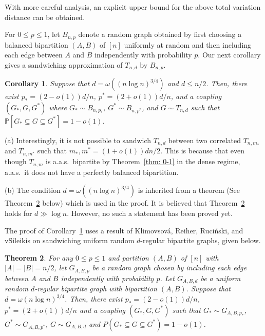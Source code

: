\documentclass[11pt]{article}
\renewcommand{\v}{\textup{\textsf{v}}}
\def\P{\mathbb P}
\theoremstyle{plain}
\newtheorem{thm}{Theorem}[section]
\newtheorem{cor}[thm]{Corollary}
\begin{document}
    With more careful analysis, an explicit upper bound for the above total variation distance can be obtained.




For $0 \leq p \leq 1$, let $B_{n,p}$ denote a random graph obtained by first choosing a balanced bipartition $(A,B)$ of $[n]$ uniformly at random and then including each edge between $A$ and $B$ independently with probability $p$. Our next corollary gives a sandwiching approximation of $T_{n,d}$ by $B_{n,p}$.

\begin{cor}\label{cor: our sandwich}
     Suppose that $d = \omega((n\log n)^{3/4})$ and $d\le n/2$. Then, there exist $p_* = (2 - o(1))d/n$, $p^* = (2 + o(1))d/n$, and a coupling $(G_*, G, G^*)$ where $G_* \sim B_{n, p_*}$, $G^* \sim B_{n, p^*}$, and $G \sim T_{n,d}$ such that $\P[G_* \subseteq G \subseteq G^*] = 1 - o(1)$.
\end{cor}

(a) Interestingly, it is not possible to sandwich $T_{n,d}$ between two correlated $T_{n,m_*}$ and $T_{n,m^*}$ such that $m_*,m^*=(1+o(1))dn/2$. This is because that even though $T_{n,m}$ is a.a.s.\ bipartite by Theorem~\ref{thm: 0-1} in the dense regime, a.a.s.\ it does not have a perfectly balanced bipartition. 


(b) The condition $d=\omega((n\log n)^{3/4})$ is inherited from a theorem (See Theorem~\ref{thm: bip coupling} below) which is used in the proof. It is believed that Theorem~\ref{thm: bip coupling} holds for $d\gg \log n$. However, no such a statement has been proved yet. 


\smallskip

The proof of Corollary~\ref{cor: our sandwich} uses a result of Klimo{\v{s}}ov{\'a}, Reiher, Ruci{\'n}ski, and {\v{S}}ileikis on sandwiching uniform random $d$-regular bipartite graphs, given below.
\begin{thm}\cite{KlimosovaReiherRucinskiSileikis2023}\label{thm: bip coupling}
For any $0 \leq p \leq 1$ and partition $(A,B)$ of $[n]$ with $|A| = |B| = n/2$, let $G_{A, B, p}$ be a random graph chosen by including each edge between $A$ and $B$ independently with probability $p$. Let $G_{A,B, d}$ be a uniform random $d$-regular bipartite graph with bipartition $(A,B)$. 
Suppose that $d = \omega(n\log n)^{3/4}$. Then, there exist $p_* = (2- o(1))d/n$,
$p^* = (2 + o(1))d/n$ and a coupling  $(G_*, G, G^*)$ such that $G_* \sim G_{A,B, p_*}$, $G^* \sim G_{A,B, p^*}$,
$G \sim G_{A,B, d}$ and $P(G_* \subseteq G \subseteq G^*) = 1- o(1)$.    
\end{thm}
\end{document}
